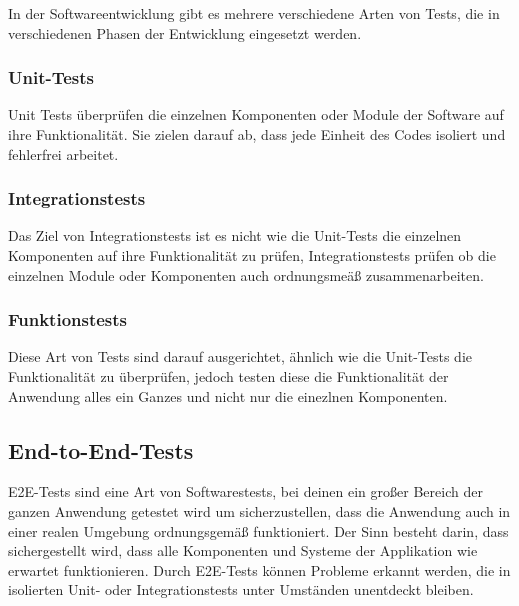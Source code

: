 In der Softwareentwicklung gibt es mehrere verschiedene Arten von Tests, die in verschiedenen Phasen der Entwicklung eingesetzt werden.

\subsubsection{Unit-Tests}
Unit Tests überprüfen die einzelnen Komponenten oder Module der Software auf ihre Funktionalität. Sie zielen darauf ab, dass jede Einheit des Codes isoliert und fehlerfrei arbeitet.


\subsubsection{Integrationstests}
Das Ziel von Integrationstests ist es nicht wie die Unit-Tests die einzelnen Komponenten auf ihre Funktionalität zu prüfen, Integrationstests prüfen ob die einzelnen Module oder Komponenten auch ordnungsmeäß zusammenarbeiten.

\subsubsection{Funktionstests}
Diese Art von Tests sind darauf ausgerichtet, ähnlich wie die Unit-Tests die Funktionalität zu überprüfen, jedoch testen diese die Funktionalität der Anwendung alles ein Ganzes und nicht nur die einezlnen Komponenten.

\subsection{End-to-End-Tests}
E2E-Tests sind eine Art von Softwarestests, bei deinen ein großer Bereich der ganzen Anwendung getestet wird um sicherzustellen, dass die Anwendung auch in einer realen Umgebung ordnungsgemäß funktioniert. Der Sinn besteht darin, dass sichergestellt wird, dass alle Komponenten und Systeme der Applikation wie erwartet funktionieren. Durch E2E-Tests können Probleme erkannt werden, die in isolierten Unit- oder Integrationstests unter Umständen unentdeckt bleiben.
